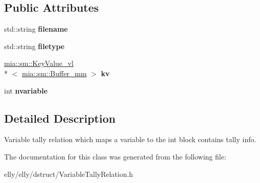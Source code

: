 \subsection*{Public Attributes}
\begin{DoxyCompactItemize}
\item 
\hypertarget{classmia_1_1elly_1_1dstruct_1_1_variable_tally_relation_a215fa9dcce3e8e1e6966187f6ec22fff}{std\-::string {\bfseries filename}}\label{classmia_1_1elly_1_1dstruct_1_1_variable_tally_relation_a215fa9dcce3e8e1e6966187f6ec22fff}

\item 
\hypertarget{classmia_1_1elly_1_1dstruct_1_1_variable_tally_relation_a352086250fc1f8190752fc6fb2695aa0}{std\-::string {\bfseries filetype}}\label{classmia_1_1elly_1_1dstruct_1_1_variable_tally_relation_a352086250fc1f8190752fc6fb2695aa0}

\item 
\hypertarget{classmia_1_1elly_1_1dstruct_1_1_variable_tally_relation_a4f4749f2b8012f7f3b6adc79b8259a9a}{\hyperlink{classmia_1_1sm_1_1_key_value__vl}{mia\-::sm\-::\-Key\-Value\-\_\-vl}\\*
$<$ \hyperlink{classmia_1_1sm_1_1_buffer__mm}{mia\-::sm\-::\-Buffer\-\_\-mm} $>$ {\bfseries kv}}\label{classmia_1_1elly_1_1dstruct_1_1_variable_tally_relation_a4f4749f2b8012f7f3b6adc79b8259a9a}

\item 
\hypertarget{classmia_1_1elly_1_1dstruct_1_1_variable_tally_relation_a1057afeffd94e72b1f7e1778ad0a268b}{int {\bfseries nvariable}}\label{classmia_1_1elly_1_1dstruct_1_1_variable_tally_relation_a1057afeffd94e72b1f7e1778ad0a268b}

\end{DoxyCompactItemize}


\subsection{Detailed Description}
Variable tally relation which maps a variable to the int block contains tally info. 

The documentation for this class was generated from the following file\-:\begin{DoxyCompactItemize}
\item 
elly/elly/dstruct/Variable\-Tally\-Relation.\-h\end{DoxyCompactItemize}

